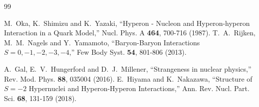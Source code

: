\documentclass[aps,prd,showpacs,floatfix,reprint,nofootinbib]{revtex4-1}
\begin{document}
\begin{thebibliography}{99}

M.~Oka, K.~Shimizu and K.~Yazaki,
``Hyperon - Nucleon and Hyperon-hyperon Interaction in a Quark Model,''
Nucl. Phys. A \textbf{464}, 700-716 (1987).
T.~A.~Rijken, M.~M.~Nagels and Y.~Yamamoto,
``Baryon-Baryon Interactions $S = 0, -1, -2, -3, -4$,''
Few Body Syst. \textbf{54}, 801-806 (2013).

A.~Gal, E.~V.~Hungerford and D.~J.~Millener,
``Strangeness in nuclear physics,''
Rev. Mod. Phys. \textbf{88}, 035004 (2016).
E.~Hiyama and K.~Nakazawa,
``Structure of $S=-2$ Hypernuclei and Hyperon-Hyperon Interactions,''
Ann. Rev. Nucl. Part. Sci. \textbf{68}, 131-159 (2018).


\end{thebibliography}
\end{document}
